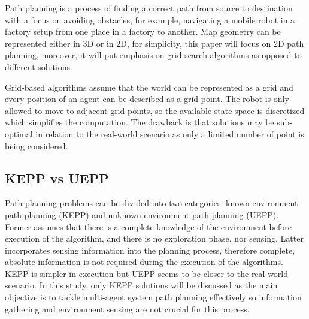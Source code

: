 Path planning is a process of finding a correct path from source to destination with a focus on avoiding obstacles, for example, navigating a mobile robot in a factory setup from one place in a factory to another\cite{path_planning}. Map geometry can be represented either in 3D or in 2D, for simplicity, this paper will focus on 2D path planning, moreover, it will put emphasis on grid-search algorithms as opposed to different solutions.

Grid-based algorithms assume that the world can be represented as a grid and every position of an agent can be described as a grid point. The robot is only allowed to move to adjacent grid points, so the available state space is discretized which simplifies the computation. The drawback is that solutions may be sub-optimal in relation to the real-world scenario as only a limited number of point is being considered\cite{SARANYA2014766}.

\subsection{KEPP vs UEPP}
Path planning problems can be divided into two categories: known-environment path planning
(KEPP) and unknown-environment path planning (UEPP). Former assumes that there is a complete knowledge of the environment before execution of the algorithm, and there is no exploration phase, nor sensing. Latter incorporates sensing information into the planning process, therefore complete, absolute information is not required during the execution of the algorithms. KEPP is simpler in execution but UEPP seems to be closer to the real-world scenario. In this study, only KEPP solutions will be discussed as the main objective is to tackle multi-agent system path planning effectively so information gathering and environment sensing are not crucial for this process\cite{path_planning_protocols}.